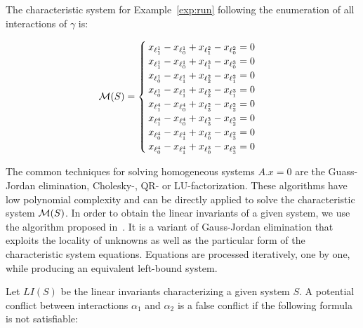 \begin{example}
  The characteristic system for Example~\ref{exp:run} following the enumeration of all 
  interactions of $\gamma$ is:

  \[\mathcal{M}(S)=\begin{cases}
    x_{\ell_1^1}-x_{\ell_0^1}+x_{\ell_1^2}-x_{\ell_0^2}=0\\ 
    x_{\ell_1^1}-x_{\ell_0^1}+x_{\ell_1^3}-x_{\ell_0^3}=0\\ 
    x_{\ell_0^1}-x_{\ell_1^1}+x_{\ell_2^2}-x_{\ell_1^2}=0\\ 
    x_{\ell_0^1}-x_{\ell_1^1}+x_{\ell_2^3}-x_{\ell_1^3}=0\\ 
    x_{\ell_1^4}-x_{\ell_0^4}+x_{\ell_3^2}-x_{\ell_2^2}=0\\ 
    x_{\ell_1^4}-x_{\ell_0^4}+x_{\ell_3^3}-x_{\ell_2^3}=0\\ 
    x_{\ell_0^4}-x_{\ell_1^4}+x_{\ell_0^2}-x_{\ell_3^2}=0\\ 
    x_{\ell_0^4}-x_{\ell_1^4}+x_{\ell_0^3}-x_{\ell_3^3}=0\\ 
  
  
  \end{cases}\]

\end{example}

The common techniques for solving homogeneous systems $A.x=0$ are the Guass-Jordan elimination,
Cholesky-, QR- or LU-factorization. These algorithms have low polynomial complexity and
can be directly applied to solve the characteristic system $\mathcal{M}(S)$.
In order to obtain the linear invariants of a given system, we use the algorithm 
proposed in~\cite{inv-lin}. It is a variant of Gauss-Jordan elimination that exploits 
the locality of unknowns as well as the particular form of the characteristic system equations. 
Equations are processed iteratively, one by one, while producing an equivalent left-bound system.

Let $LI(S)$ be the linear invariants characterizing a given system $S$.
A potential conflict between interactions $\alpha_1$ and $\alpha_2$ is a false conflict if the 
following formula is not satisfiable:

